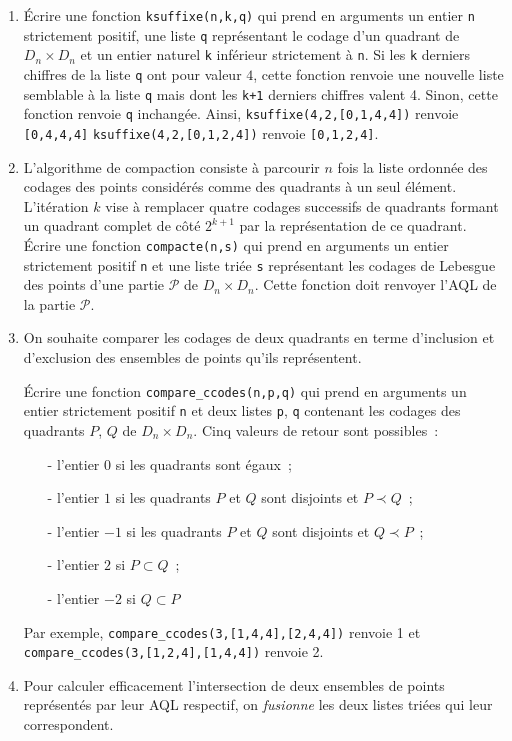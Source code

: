 \begin{enumerate}[resume]
\item \'Ecrire une fonction {\tt ksuffixe(n,k,q)} qui prend en arguments un entier {\tt n} strictement positif, une liste {\tt q} repr\'esentant le codage d'un quadrant de $D_n\times D_n$ et un entier naturel {\tt k} inf\'erieur strictement \`a {\tt n}. Si les {\tt k} derniers chiffres de la liste {\tt q} ont pour valeur $4$, cette fonction renvoie une nouvelle liste semblable \`a la liste {\tt q} mais dont les {\tt k+1} derniers chiffres valent 4. Sinon, cette fonction renvoie {\tt q} inchang\'ee. Ainsi,\newline 
{\tt ksuffixe(4,2,[0,1,4,4])}  renvoie {\tt [0,4,4,4]}\newline
{\tt ksuffixe(4,2,[0,1,2,4])} renvoie {\tt [0,1,2,4]}.

\item L'algorithme de compaction consiste \`a parcourir $n$ fois la liste ordonnée des codages des points considérés comme des quadrants à un seul élément. L'it\'eration $k$ vise \`a remplacer quatre codages successifs de quadrants formant un quadrant complet de c\^ot\'e $2^{k+1}$ par la repr\'esentation de ce quadrant.\newline
\'Ecrire une fonction {\tt compacte(n,s)} qui prend en arguments un entier strictement positif {\tt n} et une liste tri\'ee {\tt s} représentant les codages de Lebesgue des points d'une partie $\mathcal{P}$ de $D_n\times D_n$. Cette fonction doit renvoyer l'AQL de la partie $\mathcal{P}$.

\item On souhaite comparer les codages de deux quadrants en terme d'inclusion et d'exclusion des ensembles de points qu'ils repr\'esentent.

\'Ecrire une fonction {\tt compare\_ccodes(n,p,q)} qui prend en arguments un entier strictement positif {\tt n} et deux listes {\tt p}, {\tt q} contenant les codages des quadrants $P$, $Q$ de $D_n\times D_n$. Cinq valeurs de retour sont possibles~:
\begin{itemize}
\item[-] l'entier $0$ si les quadrants sont \'egaux~;
\item[-] l'entier $1$ si les quadrants $P$ et $Q$ sont disjoints et $P \prec Q$~;
\item[-] l'entier $-1$ si les quadrants $P$ et $Q$ sont disjoints et $Q \prec P$~;
\item[-] l'entier $2$ si $P\subset Q$~;
\item[-] l'entier $-2$ si $Q\subset P$
\end{itemize}
Par exemple, {\tt compare\_ccodes(3,[1,4,4],[2,4,4])} renvoie 1 et\\
{\tt compare\_ccodes(3,[1,2,4],[1,4,4])} renvoie 2.
\item Pour calculer efficacement l'intersection de deux ensembles de points repr\'esent\'es par leur AQL respectif, on {\it fusionne} les deux listes tri\'ees qui leur correspondent.


\end{enumerate}
